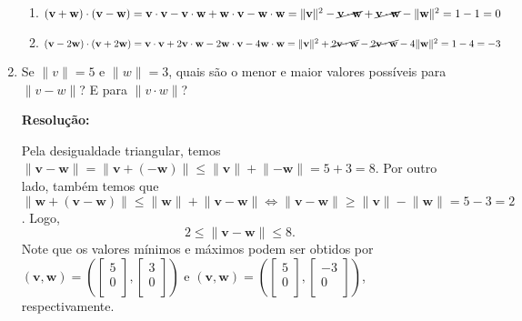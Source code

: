 \documentclass[leqno]{article}
\begin{document}
\begin{enumerate}
\begin{enumerate}
        \item $(\textbf{v}+\textbf{w})\cdot(\textbf{v}-\textbf{w})=\textbf{v}\cdot\textbf{v}-\textbf{v}\cdot\textbf{w}+\textbf{w}\cdot\textbf{v}-\textbf{w}\cdot\textbf{w}=\lVert\textbf{v}\rVert^2-\cancel{\textbf{v}\cdot\textbf{w}}+\cancel{\textbf{v}\cdot\textbf{w}}-\lVert\textbf{w}\rVert^2=1-1=0$
        
        \item $(\textbf{v}-2\textbf{w})\cdot(\textbf{v}+2\textbf{w})=\textbf{v}\cdot\textbf{v}+2\textbf{v}\cdot\textbf{w}-2\textbf{w}\cdot\textbf{v}-4\textbf{w}\cdot\textbf{w}=\lVert\textbf{v}\rVert^2+\cancel{2\textbf{v}\cdot\textbf{w}}-\cancel{2\textbf{v}\cdot\textbf{w}}-4\lVert\textbf{w}\rVert^2=1-4=-3$
    \end{enumerate}
    
    \item Se $\lVert v\rVert = 5$ e $\lVert w\rVert = 3$, quais são o menor e maior valores possíveis para $\lVert v - w\rVert$? E para $\lVert v \cdot w\rVert$?
    
    \textbf{Resolução:}
    
    Pela desigualdade triangular, temos $\lVert\textbf{v}-\textbf{w}\rVert=\lVert\textbf{v}+(-\textbf{w})\rVert\leq\lVert\textbf{v}\rVert+\lVert-\textbf{w}\rVert=5+3=8$. Por outro lado, também temos que $\lVert\textbf{w}+(\textbf{v}-\textbf{w})\rVert\leq\lVert\textbf{w}\rVert+\lVert\textbf{v}-\textbf{w}\rVert\iff\lVert\textbf{v}-\textbf{w}\rVert\geq\lVert\textbf{v}\rVert-\lVert\textbf{w}\rVert=5-3=2$. Logo, $$2\leq\lVert\textbf{v}-\textbf{w}\rVert\leq8\text{.}$$
    Note que os valores mínimos e máximos podem ser obtidos por $(\textbf{v},\textbf{w})=\left(\begin{bmatrix}5\\0\\ \end{bmatrix},\begin{bmatrix}3\\0\\ \end{bmatrix}\right)$ e $(\textbf{v},\textbf{w})=\left(\begin{bmatrix}5\\0\\ \end{bmatrix},\begin{bmatrix}-3\\0\\ \end{bmatrix}\right)$, respectivamente.
    

\end{enumerate}
\end{document}
